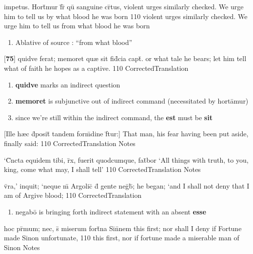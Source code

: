\latline
  {impetus.  Hort\={}mur f\={}r\={\macron {\i}} qu\={} sanguine cr\={}tus,}
  { violent urges similarly checked.  We urge him to tell us by what blood he was born }
  {110}
  { violent urges similarly checked.  We urge him to tell us from what blood he was born }
  { \begin{enumerate}
  	\item Ablative of source : ``from what blood''
  \end{enumerate} }


\latline
  {[\textbf{75}] quidve ferat; memoret qu{\ae} sit fid\={}cia capt\={}.}
  { or what tale he bears; let him tell what of faith he hopes as a captive. }
  {110}
  { CorrectedTranslation }
  { \begin{enumerate}
  	\item \textbf{quidve} marks an indirect question
  	\item \textbf{memoret} is subjunctive out of indirect command (necessitated by hort\={a}mur)
  	\item since we're still within the indirect command, the \textbf{est} must be \textbf{sit}
  \end{enumerate} }


\latline
  {[Ille h{\ae}c d\={}posit\={} tandem form\={\macron {\i}}dine f\={}tur:] }
  { That man, his fear having been put aside, finally said: }
  {110}
  { CorrectedTranslation }
  { Notes }


\latline
  {`C\={}ncta equidem tibi, r\={}x, fuerit quodcumque, fat\={}bor}
  { `All things with truth, to you, king, come what may, I shall tell' }
  {110}
  { CorrectedTranslation }
  { Notes }


\latline
  {v\={}ra,' inquit; `neque m\={} Argolic\={} d\={} gente neg\={}b\={};}
  {  he began; `and I shall not deny that I am of Argive blood;  }
  {110}
  { CorrectedTranslation }
  { \begin{enumerate}
  	\item negab\={o} is bringing forth indirect statement with an absent \textbf{esse}
  \end{enumerate} }


\latline
  {hoc pr\={\macron {\i}}mum; nec, s\={\macron {\i}} miserum fort\={}na Sin\={}nem}
  { this first; nor shall I deny if Fortune made Sinon unfortunate,  }
  {110}
  { this first, nor if fortune made a miserable man of Sinon }
  { Notes }


